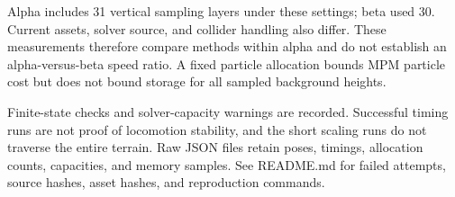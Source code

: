 \documentclass[10pt]{article}
\begin{document}
Alpha includes 31 vertical sampling layers under these settings; beta used 30. Current assets, solver source, and collider handling also differ. These measurements therefore compare methods within alpha and do not establish an alpha-versus-beta speed ratio. A fixed particle allocation bounds MPM particle cost but does not bound storage for all sampled background heights.

Finite-state checks and solver-capacity warnings are recorded. Successful timing runs are not proof of locomotion stability, and the short scaling runs do not traverse the entire terrain. Raw JSON files retain poses, timings, allocation counts, capacities, and memory samples. See README.md for failed attempts, source hashes, asset hashes, and reproduction commands.
\end{document}
